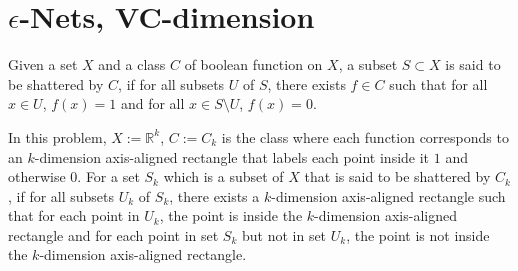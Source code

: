 \section{$\epsilon$-Nets, VC-dimension}
\noindent {}
\begin{definition}
    Given a set $X$ and a class $C$ of boolean function on $X$, 
    a subset $S \subset X$ is said to be shattered by $C$, 
    if for all subsets $U$ of $S$, there exists $f\in C$ such that for all 
    $x\in U$, $f(x) = 1$ and for all $x\in S \setminus U$, $f(x)=0$.
\end{definition}
In this problem, $X:=\mathbb{R}^k$, $C:=C_k$ is the class where each function 
corresponds to an $k$-dimension axis-aligned rectangle that labels each point inside it $1$ and otherwise $0$.
For a set $S_k$ which is a subset of $X$ that is said to be shattered by $C_k$,
if for all subsets $U_k$ of $S_k$, there exists a $k$-dimension axis-aligned rectangle such that for each point in 
$U_k$, the point is inside the $k$-dimension axis-aligned rectangle 
and for each point in set $S_k$ but not in set $U_k$, the point is not inside the  $k$-dimension axis-aligned rectangle.

